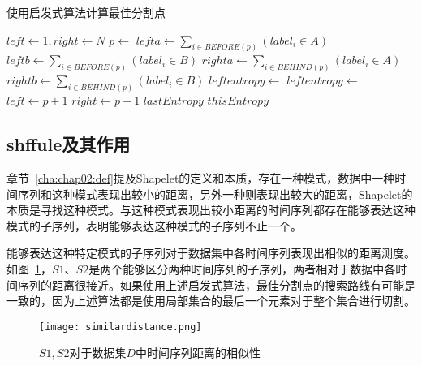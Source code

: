\begin{algorithm}
	\caption{使用启发式算法计算最佳分割点}
	\label{alg:HeuristicSplitInfogain3}
	\begin{algorithmic}[1]
			\State $left \gets 1,right \gets N$
				\State $p \gets $ 
				\State $lefta \gets \sum_{i\in BEFORE(p)}(label_i\in A)$ \label{afterpartion}
				\State $leftb \gets \sum_{i\in BEFORE(p)}(label_i\in B)$
				\State $righta \gets  \sum_{i \in BEHIND(p)}(label_i \in A)$
				\State $rightb \gets  \sum_{i \in BEHIND(p)}(label_i \in B)$
				\State $leftentropy \gets $ 
				\State $leftentropy \gets $  \label{afterpartion2}
					\State $left \gets p+1$
				\Else
					\State $right \gets p-1$
				\EndIf
					\State \Return $lastEntropy$
				\EndIf
			\EndWhile
			\State \Return $thisEntropy$
		\EndFunction
	\end{algorithmic}
\end{algorithm}


\subsection{shffule及其作用}

章节~\ref{cha:chap02:def}提及Shapelet的定义和本质，存在一种模式，数据中一种时间序列和这种模式表现出较小的距离，另外一种则表现出较大的距离，Shapelet的本质是寻找这种模式。与这种模式表现出较小距离的时间序列都存在能够表达这种模式的子序列，表明能够表达这种模式的子序列不止一个。

{\color{red}{”是否需要解释一下局部集合和分类模式",$SubDist(S1,T),SubDist(S2,T)$看一下这两段叙述的距离是否合理}}


能够表达这种特定模式的子序列对于数据集中各时间序列表现出相似的距离测度。如图~\ref{fig:similardistance}，$S1$、$S2$是两个能够区分两种时间序列的子序列，两者相对于数据中各时间序列的距离很接近。如果使用上述启发式算法，最佳分割点的搜索路线有可能是一致的，因为上述算法都是使用局部集合的最后一个元素对于整个集合进行切割。

\begin{figure}[H] %
	\centering
	\texttt{[image: similardistance.png]}
	\caption{$S1,S2$对于数据集$D$中时间序列距离的相似性}
	\label{fig:similardistance}
\end{figure}

